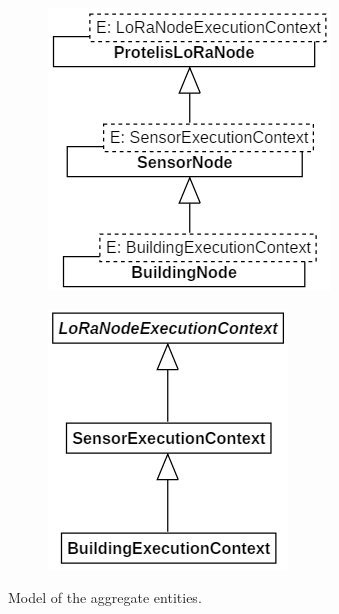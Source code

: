 \begin{figure}[h]
    \centering
    \begin{subfigure}{.495\textwidth}
        \centering
        \includegraphics{figures/NodeAC_caseStudy.png}
        \caption{}
        \label{fig:caseBmodel_a}
    \end{subfigure}
    \begin{subfigure}{.495\textwidth}
        \centering
        \includegraphics{figures/ECAC_caseStudy.png}
        \caption{}
        \label{fig:caseBmodel_b}
    \end{subfigure}
    \caption{Model of the aggregate entities.}
    \label{fig:caseBmodel}
\end{figure}

